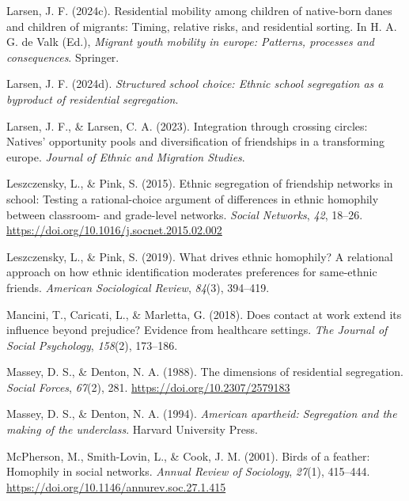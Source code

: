 \documentclass[
]{book}
\newlength{\cslhangindent}
\newenvironment{CSLReferences}[2] %
 {\begin{list}{}{%
  \setlength{\itemindent}{0pt}
  \setlength{\leftmargin}{0pt}
  \setlength{\parsep}{0pt}
  \ifodd #1
   \setlength{\leftmargin}{\cslhangindent}
   \setlength{\itemindent}{-1\cslhangindent}
  \fi
  \setlength{\itemsep}{#2\baselineskip}}}
 {\end{list}}
\begin{document}
\begin{CSLReferences}{1}{0}
Larsen, J. F. (2024c). Residential mobility among children of native-born danes and children of migrants: Timing, relative risks, and residential sorting. In H. A. G. de Valk (Ed.), \emph{Migrant youth mobility in europe: Patterns, processes and consequences}. Springer.

Larsen, J. F. (2024d). \emph{Structured school choice: Ethnic school segregation as a byproduct of residential segregation}.

Larsen, J. F., \& Larsen, C. A. (2023). Integration through crossing circles: Natives' opportunity pools and diversification of friendships in a transforming europe. \emph{Journal of Ethnic and Migration Studies}.

Leszczensky, L., \& Pink, S. (2015). Ethnic segregation of friendship networks in school: Testing a rational-choice argument of differences in ethnic homophily between classroom- and grade-level networks. \emph{Social Networks}, \emph{42}, 18--26. \url{https://doi.org/10.1016/j.socnet.2015.02.002}

Leszczensky, L., \& Pink, S. (2019). What drives ethnic homophily? A relational approach on how ethnic identification moderates preferences for same-ethnic friends. \emph{American Sociological Review}, \emph{84}(3), 394--419.

Mancini, T., Caricati, L., \& Marletta, G. (2018). Does contact at work extend its influence beyond prejudice? Evidence from healthcare settings. \emph{The Journal of Social Psychology}, \emph{158}(2), 173--186.

Massey, D. S., \& Denton, N. A. (1988). The dimensions of residential segregation. \emph{Social Forces}, \emph{67}(2), 281. \url{https://doi.org/10.2307/2579183}

Massey, D. S., \& Denton, N. A. (1994). \emph{American apartheid: Segregation and the making of the underclass}. Harvard University Press.

McPherson, M., Smith-Lovin, L., \& Cook, J. M. (2001). Birds of a feather: Homophily in social networks. \emph{Annual Review of Sociology}, \emph{27}(1), 415--444. \url{https://doi.org/10.1146/annurev.soc.27.1.415}


\end{CSLReferences}
\end{document}
